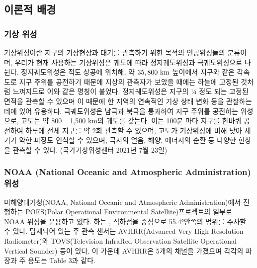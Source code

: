 \subsection{이론적 배경}

\subsubsection{기상 위성}

기상위성이란 지구의 기상현상과 대기를 관측하기 위한 목적의 인공위성들의 분류이며, 우리가 현재 사용하는 기상위성은 궤도에 따라 정지궤도위성과 극궤도위성으로 나뉜다. 정지궤도위성은 적도 상공에 위치해, 약 $35,800 ~\rm{km}$ 높이에서 지구와 같은 각속도로 지구 주위를 공전하기 때문에 지상의 관측자가 보았을 때에는 하늘에 고정된 것처럼 느껴지므로 이와 같은 명칭이 붙었다. 정지궤도위성은 지구의 ¼ 정도 되는 고정된 면적을 관측할 수 있으며 이 때문에 한 지역의 연속적인 기상 상태 변화 등을 관찰하는 데에 있어 유용하다. 극궤도위성은 남극과 북극을 통과하여 지구 주위를 공전하는 위성으로, 고도는 약 800 ~ 1,500 km의 궤도를 갖는다. 이는 100분 마다 지구를 한바퀴 공전하여 하루에 전체 지구를 약 2회 관측할 수 있으며, 고도가 기상위성에 비해 낮아 세기가 약한 파장도 인식할 수 있으며, 극지의 얼음, 해양, 에너지의 순환 등 다양한 현상을 관측할 수 있다. (국가기상위성센터 2021년 7월 23일)

\subsubsection{NOAA (National Oceanic and Atmospheric Administration) 위성}

미해양대기청(NOAA, National Oceanic and Atmospheric Administration)에서 진행하는 POES(Polar Operational Environmental Satellite)프로젝트의 일부로 NOAA 위성을 운용하고 있다. 하는 , 직하점을 중심으로 55.4°안쪽의 범위를 주사할 수 있다. 탑재되어 있는 주 관측 센서는 AVHRR(Advanced Very High Resolution Radiometer)와 TOVS(Television InfraRed Observation Satellite Operational Vertical Sounder) 등이 있다. 이 가운데 AVHRR은 5개의 채널을 가졌으며 각각의 파장과 주 용도는 Table 3과 같다.

